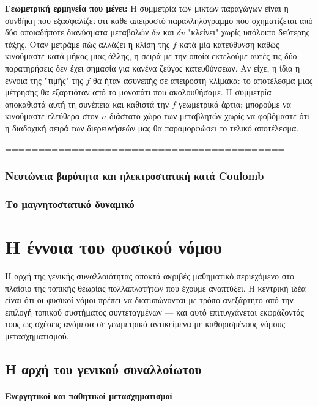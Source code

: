 \documentclass[11pt,a4paper,twoside,openright]{book}
\begin{document}
\textbf{Γεωμετρική ερμηνεία που μένει:} Η συμμετρία των μικτών παραγώγων είναι η συνθήκη που εξασφαλίζει ότι κάθε απειροστό παραλληλόγραμμο που σχηματίζεται από δύο οποιαδήποτε διανύσματα μεταβολών \(\delta u\) και \(\delta v\) "κλείνει" χωρίς υπόλοιπο δεύτερης τάξης. Όταν μετράμε πώς αλλάζει η κλίση της \(f\) κατά μία κατεύθυνση καθώς κινούμαστε κατά μήκος μιας άλλης, η σειρά με την οποία εκτελούμε αυτές τις δύο παρατηρήσεις δεν έχει σημασία για κανένα ζεύγος κατευθύνσεων. Αν είχε, η ίδια η έννοια της "τιμής" της \(f\) θα ήταν ασυνεπής σε απειροστή κλίμακα: το αποτέλεσμα μιας μέτρησης θα εξαρτιόταν από το μονοπάτι που ακολουθήσαμε. Η συμμετρία αποκαθιστά αυτή τη συνέπεια και καθιστά την \(f\) γεωμετρικά άρτια: μπορούμε να κινούμαστε ελεύθερα στον \(n\)-διάστατο χώρο των μεταβλητών χωρίς να φοβόμαστε ότι η διαδοχική σειρά των διερευνήσεών μας θα παραμορφώσει το τελικό αποτέλεσμα.

==========================================

\subsection{Νευτώνεια βαρύτητα και ηλεκτροστατική κατά Coulomb}
\subsection{Το μαγνητοστατικό δυναμικό}


\chapter{Η έννοια του φυσικού νόμου}
	\label{chapter:concept-of-law-of-nature}


Η αρχή της γενικής συναλλοιότητας αποκτά ακριβές μαθηματικό περιεχόμενο στο πλαίσιο της τοπικής θεωρίας πολλαπλοτήτων που έχουμε αναπτύξει. Η κεντρική ιδέα είναι ότι οι φυσικοί νόμοι πρέπει να διατυπώνονται με τρόπο ανεξάρτητο από την επιλογή τοπικού συστήματος συντεταγμένων — και αυτό επιτυγχάνεται εκφράζοντάς τους ως σχέσεις ανάμεσα σε γεωμετρικά αντικείμενα με καθορισμένους νόμους μετασχηματισμού.

\section{Η αρχή του γενικού συναλλοίωτου}

\subsubsection{Ενεργητικοί και παθητικοί μετασχηματισμοί}
\end{document}
